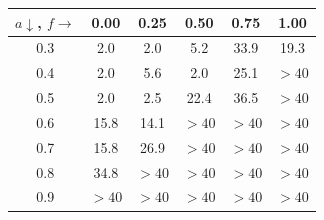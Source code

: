 \begin{tabular}{c|ccccc}
\toprule
$a \downarrow$, $f \rightarrow$ & 0.00 & 0.25 & 0.50 & 0.75 & 1.00 \\
\midrule
0.3 & 2.0 & 2.0 & 5.2 & 33.9 & 19.3 \\
0.4 & 2.0 & 5.6 & 2.0 & 25.1 & $>40$ \\
0.5 & 2.0 & 2.5 & 22.4 & 36.5 & $>40$ \\
0.6 & 15.8 & 14.1 & $>40$ & $>40$ & $>40$ \\
0.7 & 15.8 & 26.9 & $>40$ & $>40$ & $>40$ \\
0.8 & 34.8 & $>40$ & $>40$ & $>40$ & $>40$ \\
0.9 & $>40$ & $>40$ & $>40$ & $>40$ & $>40$ \\
\bottomrule
\end{tabular}